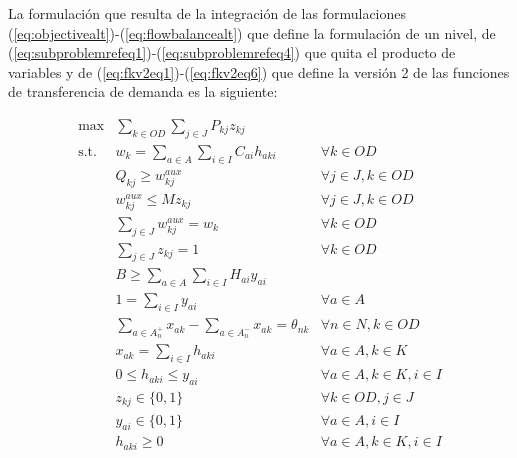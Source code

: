 \documentclass{article}
\begin{document}
  La formulación que resulta de la integración de las formulaciones (\ref{eq:objectivealt})-(\ref{eq:flowbalancealt}) que define la formulación de un nivel, de (\ref{eq:subproblemrefeq1})-(\ref{eq:subproblemrefeq4}) que quita el producto de variables y de (\ref{eq:fkv2eq1})-(\ref{eq:fkv2eq6}) que define la versión 2 de las funciones de transferencia de demanda es la siguiente:

  \begin{align}
    \text{max}    & \sum_{k \in OD} \sum_{j \in J} P_{kj} z_{kj}                          & \label{eq:objectivefinalalt} \\
    \text{s.t.}\; & w_k = \sum_{a \in A} \sum_{i \in I} C_{ai}h_{aki}                     & \forall k \in OD \label{eq:shortestpathaltfinal} \\
                  & Q_{kj} \geq w^{aux}_{kj}                                              & \forall j \in J, k \in OD \label{eq:breakpointsalt} \\
                  & w^{aux}_{kj} \leq M z_{kj}                                            & \forall j \in J, k \in OD \\
                  & \sum_{j \in J} w^{aux}_{kj} = w_k                                     & \forall k \in OD \\
                  & \sum_{j \in J} z_{kj} = 1                                             & \forall k \in OD \label{eq:singularbreakpointalt} \\
                  & B \geq \sum_{a \in A} \sum_{i \in I} H_{ai}y_{ai}                     & \label{eq:respectbudgetaltfinal} \\
                  & 1 = \sum_{i \in I} y_{ai}                                             & \forall a \in A \label{eq:alwaysoneyaltfinal} \\
                  & \sum_{a \in A_n^+} x_{ak} - \sum_{a \in A_n^-} x_{ak} = \theta_{nk}   & \forall n \in N, k \in OD \label{eq:flowbalancealtfinal} \\
                  & x_{ak} = \sum_{i \in I} h_{aki}                                       & \forall a \in A, k \in K \label{eq:flowactivationalt} \\
                  & 0 \leq h_{aki} \leq y_{ai}                                            & \forall a \in A, k \in K, i \in I \label{eq:respectinfraalt} \\
                  & z_{kj} \in \{0,1\}                                                    & \forall k \in OD, j \in J \nonumber \\
                  & y_{ai} \in \{0,1\}                                                    & \forall a \in A, i \in I \nonumber \\
                  & h_{aki} \geq 0                                                        & \forall a \in A, k \in K, i \in I \nonumber
  \end{align}
\end{document}
